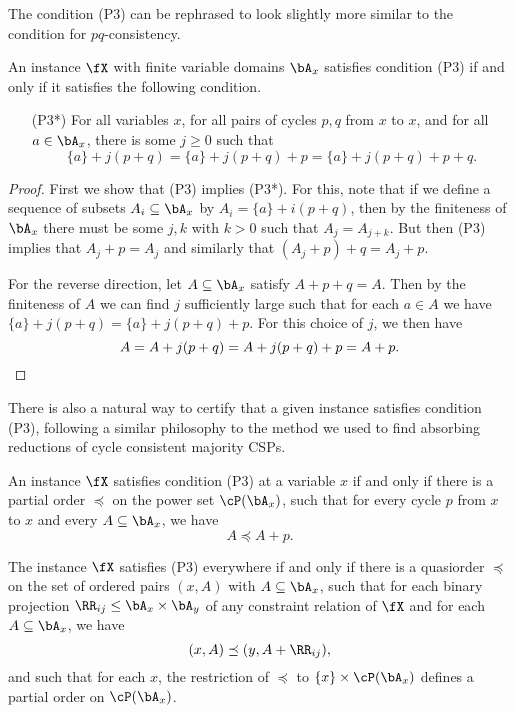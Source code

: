 The condition (P3) can be rephrased to look slightly more similar to the condition for $pq$-consistency.

\begin{prop} An instance $\fX$ with finite variable domains $\bA_x$ satisfies condition (P3) if and only if it satisfies the following condition.
\begin{itemize}
\item[(P3*)] For all variables $x$, for all pairs of cycles $p,q$ from $x$ to $x$, and for all $a \in \bA_x$, there is some $j \ge 0$ such that
\[
\{a\} + j(p+q) = \{a\} + j(p+q) + p = \{a\} + j(p+q) + p + q.
\]
\end{itemize}
\end{prop}
\begin{proof} First we show that (P3) implies (P3*). For this, note that if we define a sequence of subsets $A_i \subseteq \bA_x$ by $A_i = \{a\} + i(p+q)$, then by the finiteness of $\bA_x$ there must be some $j,k$ with $k > 0$ such that $A_j = A_{j+k}$. But then (P3) implies that $A_j + p = A_j$ and similarly that $(A_j + p) + q = A_j + p$.

For the reverse direction, let $A \subseteq \bA_x$ satisfy $A+p+q = A$. Then by the finiteness of $A$ we can find $j$ sufficiently large such that for each $a \in A$ we have $\{a\} + j(p+q) = \{a\} + j(p+q) + p$. For this choice of $j$, we then have
\[
A = A + j(p+q) = A + j(p+q) + p = A + p.\qedhere
\]
\end{proof}

There is also a natural way to certify that a given instance satisfies condition (P3), following a similar philosophy to the method we used to find absorbing reductions of cycle consistent majority CSPs.

\begin{prop} An instance $\fX$ satisfies condition (P3) at a variable $x$ if and only if there is a partial order $\preceq$ on the power set $\cP(\bA_x)$, such that for every cycle $p$ from $x$ to $x$ and every $A \subseteq \bA_x$, we have
\[
A \preceq A+p.
\]

The instance $\fX$ satisfies (P3) everywhere if and only if there is a quasiorder $\preceq$ on the set of ordered pairs $(x,A)$ with $A \subseteq \bA_x$, such that for each binary projection $\RR_{ij} \le \bA_x \times \bA_y$ of any constraint relation of $\fX$ and for each $A \subseteq \bA_x$, we have
\[
(x,A) \preceq (y,A+\RR_{ij}),
\]
and such that for each $x$, the restriction of $\preceq$ to $\{x\}\times \cP(\bA_x)$ defines a partial order on $\cP(\bA_x)$.
\end{prop}

